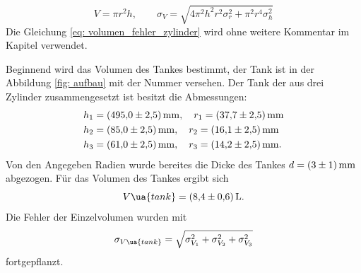 \begin{equation}
  \label{eq: volumen_fehler_zylinder}
  V=\pi r^2 h, \qquad \sigma_{V}=\sqrt{4 \pi^{2} h^{2} r^{2} \sigma_{r}^{2}  + \pi^{2} r^{4} \sigma_{h}^{2} }
\end{equation}
Die Gleichung \ref{eq: volumen_fehler_zylinder} wird ohne weitere Kommentar im Kapitel verwendet.

Beginnend wird das Volumen des Tankes bestimmt, der Tank ist in der Abbildung \ref{fig: aufbau} mit der Nummer
 versehen.
Der Tank der aus drei Zylinder zusammengesetzt ist besitzt die Abmessungen:
\begin{align*}
h_1&=\SI{495 \pm 2.5}{\milli\meter}, \quad r_1=\SI{37.7\pm2.5}{\milli\meter} \\
h_2&=\SI{85 \pm 2.5}{\milli\meter}, \quad r_2=\SI{16.1\pm 2.5}{\milli\meter} \\
h_3&=\SI{61 \pm 2.5}{\milli\meter}, \quad r_3=\SI{14.2\pm 2.5}{\milli\meter}. \\
\end{align*}
Von den Angegeben Radien wurde bereites die Dicke des Tankes $d=\SI{3\pm1}{\milli\meter}$ abgezogen.
Für das Volumen des Tankes ergibt sich
\begin{equation}
  \label{eq:volumen Tank}
  V\ua{tank}=\SI{8.4\pm0.6}{\litre}.
\end{equation}
Die Fehler der Einzelvolumen wurden mit
\begin{equation}
  \label{eq:fehler_addi}
  \sigma_{V\ua{tank}}=\sqrt{\sigma_{V_{1}}^{2} + \sigma_{V_{2}}^{2}+\sigma_{V_{3}}^{2}}
\end{equation}
fortgepflanzt.

